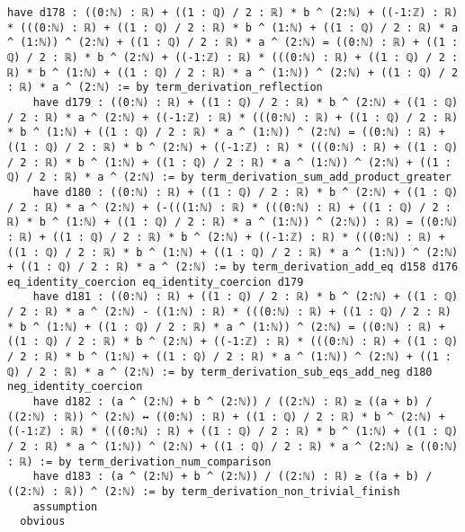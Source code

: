 \documentclass{article}
\begin{document}
\begin{tcolorbox}[colback=white!10, width=\linewidth]
\begin{lstlisting}[language=Lean4]
    have d178 : ((0:ℕ) : ℝ) + ((1 : ℚ) / 2 : ℝ) * b ^ (2:ℕ) + ((-1:ℤ) : ℝ) * (((0:ℕ) : ℝ) + ((1 : ℚ) / 2 : ℝ) * b ^ (1:ℕ) + ((1 : ℚ) / 2 : ℝ) * a ^ (1:ℕ)) ^ (2:ℕ) + ((1 : ℚ) / 2 : ℝ) * a ^ (2:ℕ) = ((0:ℕ) : ℝ) + ((1 : ℚ) / 2 : ℝ) * b ^ (2:ℕ) + ((-1:ℤ) : ℝ) * (((0:ℕ) : ℝ) + ((1 : ℚ) / 2 : ℝ) * b ^ (1:ℕ) + ((1 : ℚ) / 2 : ℝ) * a ^ (1:ℕ)) ^ (2:ℕ) + ((1 : ℚ) / 2 : ℝ) * a ^ (2:ℕ) := by term_derivation_reflection
    have d179 : ((0:ℕ) : ℝ) + ((1 : ℚ) / 2 : ℝ) * b ^ (2:ℕ) + ((1 : ℚ) / 2 : ℝ) * a ^ (2:ℕ) + ((-1:ℤ) : ℝ) * (((0:ℕ) : ℝ) + ((1 : ℚ) / 2 : ℝ) * b ^ (1:ℕ) + ((1 : ℚ) / 2 : ℝ) * a ^ (1:ℕ)) ^ (2:ℕ) = ((0:ℕ) : ℝ) + ((1 : ℚ) / 2 : ℝ) * b ^ (2:ℕ) + ((-1:ℤ) : ℝ) * (((0:ℕ) : ℝ) + ((1 : ℚ) / 2 : ℝ) * b ^ (1:ℕ) + ((1 : ℚ) / 2 : ℝ) * a ^ (1:ℕ)) ^ (2:ℕ) + ((1 : ℚ) / 2 : ℝ) * a ^ (2:ℕ) := by term_derivation_sum_add_product_greater
    have d180 : ((0:ℕ) : ℝ) + ((1 : ℚ) / 2 : ℝ) * b ^ (2:ℕ) + ((1 : ℚ) / 2 : ℝ) * a ^ (2:ℕ) + (-(((1:ℕ) : ℝ) * (((0:ℕ) : ℝ) + ((1 : ℚ) / 2 : ℝ) * b ^ (1:ℕ) + ((1 : ℚ) / 2 : ℝ) * a ^ (1:ℕ)) ^ (2:ℕ)) : ℝ) = ((0:ℕ) : ℝ) + ((1 : ℚ) / 2 : ℝ) * b ^ (2:ℕ) + ((-1:ℤ) : ℝ) * (((0:ℕ) : ℝ) + ((1 : ℚ) / 2 : ℝ) * b ^ (1:ℕ) + ((1 : ℚ) / 2 : ℝ) * a ^ (1:ℕ)) ^ (2:ℕ) + ((1 : ℚ) / 2 : ℝ) * a ^ (2:ℕ) := by term_derivation_add_eq d158 d176 eq_identity_coercion eq_identity_coercion d179
    have d181 : ((0:ℕ) : ℝ) + ((1 : ℚ) / 2 : ℝ) * b ^ (2:ℕ) + ((1 : ℚ) / 2 : ℝ) * a ^ (2:ℕ) - ((1:ℕ) : ℝ) * (((0:ℕ) : ℝ) + ((1 : ℚ) / 2 : ℝ) * b ^ (1:ℕ) + ((1 : ℚ) / 2 : ℝ) * a ^ (1:ℕ)) ^ (2:ℕ) = ((0:ℕ) : ℝ) + ((1 : ℚ) / 2 : ℝ) * b ^ (2:ℕ) + ((-1:ℤ) : ℝ) * (((0:ℕ) : ℝ) + ((1 : ℚ) / 2 : ℝ) * b ^ (1:ℕ) + ((1 : ℚ) / 2 : ℝ) * a ^ (1:ℕ)) ^ (2:ℕ) + ((1 : ℚ) / 2 : ℝ) * a ^ (2:ℕ) := by term_derivation_sub_eqs_add_neg d180 neg_identity_coercion
    have d182 : (a ^ (2:ℕ) + b ^ (2:ℕ)) / ((2:ℕ) : ℝ) ≥ ((a + b) / ((2:ℕ) : ℝ)) ^ (2:ℕ) ↔ ((0:ℕ) : ℝ) + ((1 : ℚ) / 2 : ℝ) * b ^ (2:ℕ) + ((-1:ℤ) : ℝ) * (((0:ℕ) : ℝ) + ((1 : ℚ) / 2 : ℝ) * b ^ (1:ℕ) + ((1 : ℚ) / 2 : ℝ) * a ^ (1:ℕ)) ^ (2:ℕ) + ((1 : ℚ) / 2 : ℝ) * a ^ (2:ℕ) ≥ ((0:ℕ) : ℝ) := by term_derivation_num_comparison
    have d183 : (a ^ (2:ℕ) + b ^ (2:ℕ)) / ((2:ℕ) : ℝ) ≥ ((a + b) / ((2:ℕ) : ℝ)) ^ (2:ℕ) := by term_derivation_non_trivial_finish
    assumption
  obvious

\end{lstlisting}
\end{tcolorbox}
\end{document}

